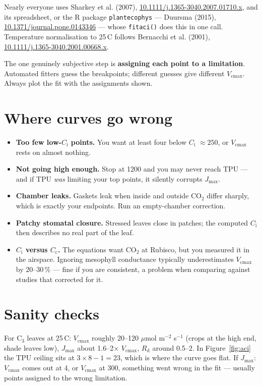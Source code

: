 \documentclass[11pt,letterpaper]{article}
\newcommand{\Vcmax}{\ensuremath{V_{\mathrm{cmax}}}}
\newcommand{\Jmax}{\ensuremath{J_{\mathrm{max}}}}
\newcommand{\Rd}{\ensuremath{R_{\mathrm{d}}}}
\newcommand{\Ci}{\ensuremath{C_{\mathrm{i}}}}
\newcommand{\Cc}{\ensuremath{C_{\mathrm{c}}}}
\newcommand{\umol}{\ensuremath{\mu}mol}
\begin{document}
Nearly everyone uses Sharkey et al. (2007),
\href{https://doi.org/10.1111/j.1365-3040.2007.01710.x}{10.1111/j.1365-3040.2007.01710.x},
and its spreadsheet, or the R package \texttt{plantecophys} --- Duursma (2015),
\href{https://doi.org/10.1371/journal.pone.0143346}{10.1371/journal.pone.0143346}
--- whose \texttt{fitaci()} does this in one call. Temperature normalisation to
25\,\textdegree C follows Bernacchi et al. (2001),
\href{https://doi.org/10.1111/j.1365-3040.2001.00668.x}{10.1111/j.1365-3040.2001.00668.x}.

The one genuinely subjective step is \textbf{assigning each point to a
limitation}. Automated fitters guess the breakpoints; different guesses give
different \Vcmax{}. Always plot the fit with the assignments shown.

\section{Where curves go wrong}

\begin{itemize}
  \item \textbf{Too few low-\Ci{} points.} You want at least four below \Ci{}
        $\approx 250$, or \Vcmax{} rests on almost nothing.
  \item \textbf{Not going high enough.} Stop at 1200 and you may never reach
        TPU --- and if TPU \emph{was} limiting your top points, it silently
        corrupts \Jmax{}.
  \item \textbf{Chamber leaks.} Gaskets leak when inside and outside CO$_2$
        differ sharply, which is exactly your endpoints. Run an empty-chamber
        correction.
  \item \textbf{Patchy stomatal closure.} Stressed leaves close in patches; the
        computed \Ci{} then describes no real part of the leaf.
  \item \textbf{\Ci{} versus \Cc{}.} The equations want CO$_2$ at Rubisco, but
        you measured it in the airspace. Ignoring mesophyll conductance
        typically underestimates \Vcmax{} by 20--30\,\% --- fine if you are
        consistent, a problem when comparing against studies that corrected
        for it.
\end{itemize}

\section{Sanity checks}

For C$_3$ leaves at 25\,\textdegree C: \Vcmax{} roughly 20--120 \umol{}
m$^{-2}$ s$^{-1}$ (crops at the high end, shade leaves low), \Jmax{} about
1.6--2$\times$ \Vcmax{}, \Rd{} around 0.5--2. In Figure~\ref{fig:aci} the TPU
ceiling sits at $3 \times 8 - 1 = 23$, which is where the curve goes flat. If
\Jmax{}:\Vcmax{} comes out at 4, or \Vcmax{} at 300, something went wrong in the
fit --- usually points assigned to the wrong limitation.
\end{document}
